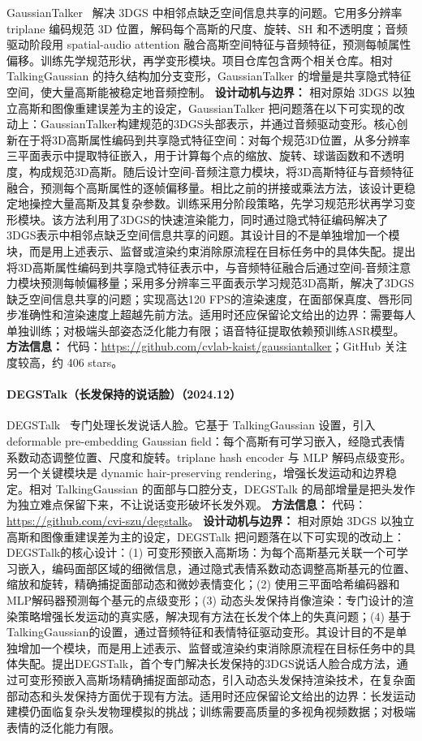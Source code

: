 GaussianTalker~\cite{2404_16012} 解决 3DGS 中相邻点缺乏空间信息共享的问题。它用多分辨率 triplane 编码规范 3D 位置，解码每个高斯的尺度、旋转、SH 和不透明度；音频驱动阶段用 spatial-audio attention 融合高斯空间特征与音频特征，预测每帧属性偏移。训练先学规范形状，再学变形模块。项目仓库包含两个相关仓库。相对 TalkingGaussian 的持久结构加分支变形，GaussianTalker 的增量是共享隐式特征空间，使大量高斯能被稳定地音频控制。
\textbf{设计动机与边界：} 相对原始 3DGS 以独立高斯和图像重建误差为主的设定，GaussianTalker 把问题落在以下可实现的改动上：GaussianTalker构建规范的3DGS头部表示，并通过音频驱动变形。核心创新在于将3D高斯属性编码到共享隐式特征空间：对每个规范3D位置，从多分辨率三平面表示中提取特征嵌入，用于计算每个点的缩放、旋转、球谐函数和不透明度，构成规范3D高斯。随后设计空间-音频注意力模块，将3D高斯特征与音频特征融合，预测每个高斯属性的逐帧偏移量。相比之前的拼接或乘法方法，该设计更稳定地操控大量高斯及其复杂参数。训练采用分阶段策略，先学习规范形状再学习变形模块。该方法利用了3DGS的快速渲染能力，同时通过隐式特征编码解决了3DGS表示中相邻点缺乏空间信息共享的问题。其设计目的不是单独增加一个模块，而是用上述表示、监督或渲染约束消除原流程在目标任务中的具体失配。提出将3D高斯属性编码到共享隐式特征表示中，与音频特征融合后通过空间-音频注意力模块预测每帧偏移量；采用多分辨率三平面表示学习规范3D高斯，解决了3DGS缺乏空间信息共享的问题；实现高达120 FPS的渲染速度，在面部保真度、唇形同步准确性和渲染速度上超越先前方法。适用时还应保留论文给出的边界：需要每人单独训练；对极端头部姿态泛化能力有限；语音特征提取依赖预训练ASR模型。
\textbf{方法信息：} 代码：\url{https://github.com/cvlab-kaist/gaussiantalker}；GitHub 关注度较高，约 406 stars。



\paragraph{DEGSTalk（长发保持的说话脸）（2024.12）}
DEGSTalk~\cite{2412_20148} 专门处理长发说话人脸。它基于 TalkingGaussian 设置，引入 deformable pre-embedding Gaussian field：每个高斯有可学习嵌入，经隐式表情系数动态调整位置、尺度和旋转。triplane hash encoder 与 MLP 解码点级变形。另一个关键模块是 dynamic hair-preserving rendering，增强长发运动和边界稳定。相对 TalkingGaussian 的面部与口腔分支，DEGSTalk 的局部增量是把头发作为独立难点保留下来，不让说话变形破坏长发外观。
\textbf{方法信息：} 代码：\url{https://github.com/cvi-szu/degstalk}。
\textbf{设计动机与边界：} 相对原始 3DGS 以独立高斯和图像重建误差为主的设定，DEGSTalk 把问题落在以下可实现的改动上：DEGSTalk的核心设计：(1) 可变形预嵌入高斯场：为每个高斯基元关联一个可学习嵌入，编码面部区域的细微信息，通过隐式表情系数动态调整高斯基元的位置、缩放和旋转，精确捕捉面部动态和微妙表情变化；(2) 使用三平面哈希编码器和MLP解码器预测每个基元的点级变形；(3) 动态头发保持肖像渲染：专门设计的渲染策略增强长发运动的真实感，解决现有方法在长发个体上的失真问题；(4) 基于TalkingGaussian的设置，通过音频特征和表情特征驱动变形。其设计目的不是单独增加一个模块，而是用上述表示、监督或渲染约束消除原流程在目标任务中的具体失配。提出DEGSTalk，首个专门解决长发保持的3DGS说话人脸合成方法，通过可变形预嵌入高斯场精确捕捉面部动态，引入动态头发保持渲染技术，在复杂面部动态和头发保持方面优于现有方法。适用时还应保留论文给出的边界：长发运动建模仍面临复杂头发物理模拟的挑战；训练需要高质量的多视角视频数据；对极端表情的泛化能力有限。
